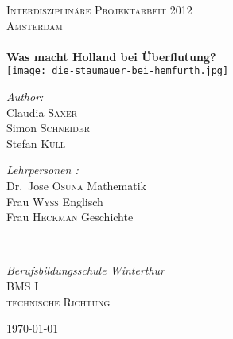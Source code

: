 
\begin{titlepage}

\begin{center}


\textsc{\LARGE Interdisziplinäre Projektarbeit 2012}\\[1.5cm]

\textsc{\Large Amsterdam}\\[0.5cm]


\HRule \\[0.4cm] 
{ \huge \bfseries Was macht Holland bei Überflutung?}
\HRule \\[0.4cm] 
\texttt{[image: die-staumauer-bei-hemfurth.jpg]}\\[1cm]    

\begin{minipage}{0.4\textwidth}
\begin{flushleft} \large
\emph{Author:}
\\Claudia \textsc{Saxer}
\\Simon \textsc{Schneider}
\\Stefan \textsc{Kull}
\end{flushleft}
\end{minipage}
\begin{minipage}{0.5\textwidth}
\begin{flushright} \large
\emph{Lehrpersonen :} 
\\Dr.~Jose \textsc{Osuna}  \textnormal{Mathematik}
\\Frau \textsc{Wyss} \textnormal{Englisch}
\\Frau \textsc{Heckman} \textnormal{Geschichte}
\end{flushright}
\end{minipage}
\\[1.5cm]
\begin{minipage}{0.5\textwidth}
\begin{center} \large
\emph{Berufsbildungsschule Winterthur} 
\\ \textsc{BMS I}
\\ \textsc{technische Richtung }
\end{center}
\end{minipage}

\vfill

{\large \today}

\end{center}

\end{titlepage}


